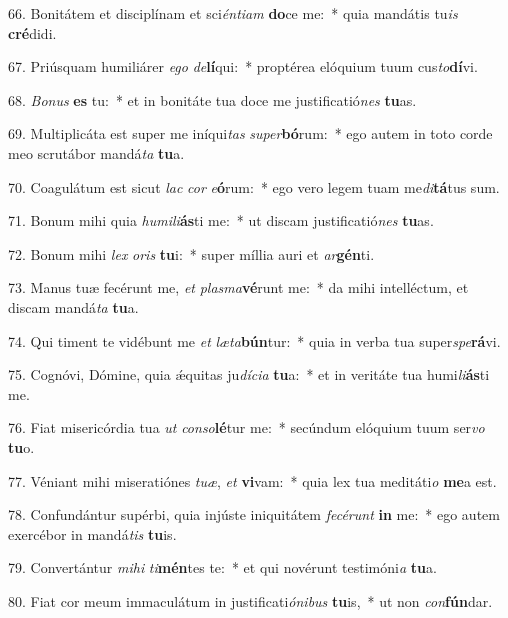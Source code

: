 66. Bonitátem et disciplínam et sci\textit{én}\textit{ti}\textit{am} \textbf{do}ce me:~*  quia mandátis tu\textit{is} \textbf{cré}didi.\

67. Priúsquam humiliárer \textit{e}\textit{go} \textit{de}\textbf{lí}qui:~*  proptérea elóquium tuum cus\textit{to}\textbf{dí}vi.\

68. \textit{Bo}\textit{nus} \textbf{es} tu:~*  et in bonitáte tua doce me justificatió\textit{nes} \textbf{tu}as.\

69. Multiplicáta est super me iníqui\textit{tas} \textit{su}\textit{per}\textbf{bó}rum:~*  ego autem in toto corde meo scrutábor mandá\textit{ta} \textbf{tu}a.\

70. Coagulátum est sicut \textit{lac} \textit{cor} \textit{e}\textbf{ó}rum:~*  ego vero legem tuam me\textit{di}\textbf{tá}tus sum.\

71. Bonum mihi quia \textit{hu}\textit{mi}\textit{li}\textbf{ás}ti me:~*  ut discam justificatió\textit{nes} \textbf{tu}as.\

72. Bonum mihi \textit{lex} \textit{o}\textit{ris} \textbf{tu}i:~*  super míllia auri et \textit{ar}\textbf{gén}ti.\

73. Manus tuæ fecérunt me, \textit{et} \textit{plas}\textit{ma}\textbf{vé}runt me:~*  da mihi intelléctum, et discam mandá\textit{ta} \textbf{tu}a.\

74. Qui timent te vidébunt me \textit{et} \textit{læ}\textit{ta}\textbf{bún}tur:~*  quia in verba tua super\textit{spe}\textbf{rá}vi.\

75. Cognóvi, Dómine, quia ǽquitas ju\textit{dí}\textit{ci}\textit{a} \textbf{tu}a:~*  et in veritáte tua humi\textit{li}\textbf{ás}ti me.\

76. Fiat misericórdia tua \textit{ut} \textit{con}\textit{so}\textbf{lé}tur me:~*  secúndum elóquium tuum ser\textit{vo} \textbf{tu}o.\

77. Véniant mihi miseratiónes \textit{tu}\textit{æ}, \textit{et} \textbf{vi}vam:~*  quia lex tua meditáti\textit{o} \textbf{me}a est.\

78. Confundántur supérbi, quia injúste iniquitátem \textit{fe}\textit{cé}\textit{runt} \textbf{in} me:~*  ego autem exercébor in mandá\textit{tis} \textbf{tu}is.\

79. Convertántur \textit{mi}\textit{hi} \textit{ti}\textbf{mén}tes te:~*  et qui novérunt testimóni\textit{a} \textbf{tu}a.\

80. Fiat cor meum immaculátum in justificati\textit{ó}\textit{ni}\textit{bus} \textbf{tu}is,~*  ut non \textit{con}\textbf{fún}dar.\


